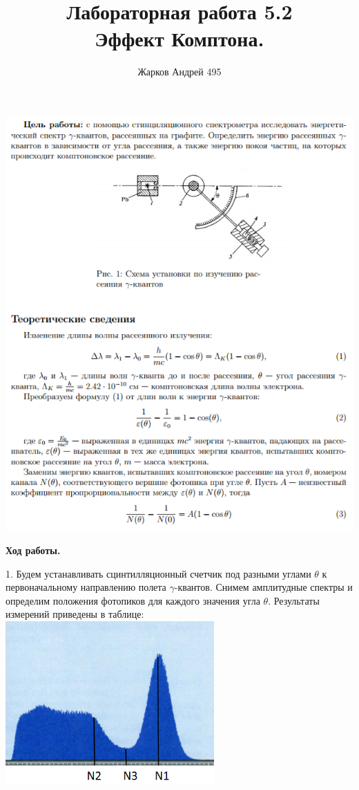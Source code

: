 \documentclass[12pt]{article}
\begin{document}
	\author {Жарков Андрей 495}
	\title {Лабораторная работа 5.2 \\  Эффект Комптона.}
    \maketitle{}
    
    \begin{center}
    	\includegraphics[width=15cm]{theory1.png}\\
    \end{center}
    
    \begin{center}
    	\textbf{\large Ход работы.}
    \end{center}
    
    1. Будем устанавливать сцинтилляционный счетчик под разными углами $\theta$ к первоначальному направлению полета $\gamma$-квантов. Снимем амплитудные спектры и определим положения фотопиков для каждого значения угла $\theta$. Результаты измерений приведены в таблице:\\
    \includegraphics[width=8cm]{img.png}\\
    
\end{document}
